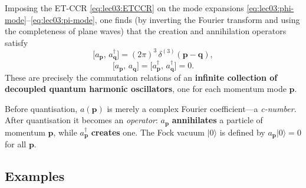 Imposing the ET-CCR \eqref{eq:lec03:ETCCR} on the mode expansions
\eqref{eq:lec03:phi-mode}--\eqref{eq:lec03:pi-mode}, one finds (by
inverting the Fourier transform and using the completeness of plane waves)
that the creation and annihilation operators satisfy
\begin{equation}
  \bigl[a_{\mathbf{p}},\,a_{\mathbf{q}}^\dagger\bigr]
  = (2\pi)^3\,\delta^{(3)}(\mathbf{p}-\mathbf{q}),
  \label{eq:lec03:a-comm}
\end{equation}
\begin{equation}
  \bigl[a_{\mathbf{p}},\,a_{\mathbf{q}}\bigr]
  = \bigl[a_{\mathbf{p}}^\dagger,\,a_{\mathbf{q}}^\dagger\bigr]
  = 0.
  \label{eq:lec03:a-zero-comm}
\end{equation}
These are precisely the commutation relations of an
\textbf{infinite collection of decoupled quantum harmonic oscillators},
one for each momentum mode $\mathbf{p}$.

\begin{remark}
Before quantisation, $a(\mathbf{p})$ is merely a complex Fourier
coefficient—a \emph{c-number}.  After quantisation it becomes an
\emph{operator}: $a_{\mathbf{p}}$ \textbf{annihilates} a particle of
momentum $\mathbf{p}$, while $a_{\mathbf{p}}^\dagger$
\textbf{creates} one.  The Fock vacuum $|0\rangle$ is defined by
$a_{\mathbf{p}}|0\rangle=0$ for all $\mathbf{p}$.
\end{remark}

\subsection*{Examples}


